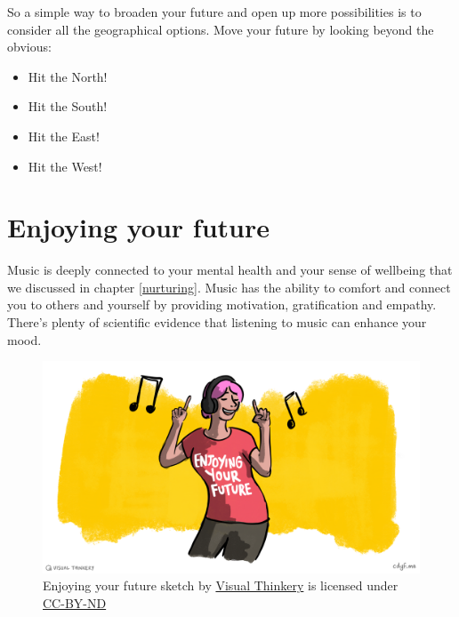 \documentclass[
]{book}
\providecommand{\tightlist}{%
  \setlength{\itemsep}{0pt}\setlength{\parskip}{0pt}}
\begin{document}
So a simple way to broaden your future and open up more possibilities is to consider all the geographical options. Move your future by looking beyond the obvious:

\begin{itemize}
\tightlist
\item
  Hit the North!
\item
  Hit the South!
\item
  Hit the East!
\item
  Hit the West!
\end{itemize}

\hypertarget{enjoying}{%
\chapter{Enjoying your future}\label{enjoying}}

Music is deeply connected to your mental health and your sense of wellbeing that we discussed in chapter \ref{nurturing}. Music has the ability to comfort and connect you to others and yourself by providing motivation, gratification and empathy. There's plenty of scientific evidence that listening to music can enhance your mood. \citep{zatorre, dopamine}

\begin{figure}

{\centering \includegraphics[width=1\linewidth]{images/Enjoying-your-future} 

}

\caption{Enjoying your future sketch by \href{https://visualthinkery.com/}{Visual Thinkery} is licensed under \href{https://creativecommons.org/licenses/by-nd/4.0/}{CC-BY-ND}}\label{fig:enjoying-fig}
\end{figure}
\end{document}
